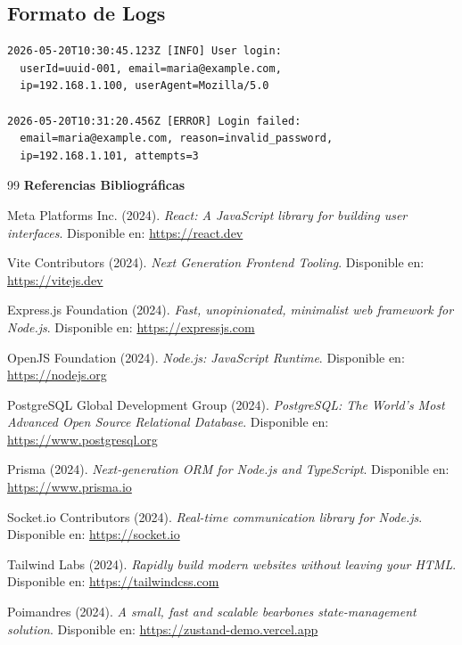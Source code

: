 \documentclass[a4paper]{report}
\begin{document}
\subsection{Formato de Logs}

\begin{lstlisting}[language=text]
2026-05-20T10:30:45.123Z [INFO] User login: 
  userId=uuid-001, email=maria@example.com, 
  ip=192.168.1.100, userAgent=Mozilla/5.0

2026-05-20T10:31:20.456Z [ERROR] Login failed: 
  email=maria@example.com, reason=invalid_password, 
  ip=192.168.1.101, attempts=3
\end{lstlisting}

\begin{thebibliography}{99}
{\Large\bfseries\color{darkblue}Referencias Bibliográficas}

\bigskip


Meta Platforms Inc. (2024). \textit{React: A JavaScript library for building user interfaces}. 
Disponible en: \url{https://react.dev}

Vite Contributors (2024). \textit{Next Generation Frontend Tooling}. 
Disponible en: \url{https://vitejs.dev}

Express.js Foundation (2024). \textit{Fast, unopinionated, minimalist web framework for Node.js}. 
Disponible en: \url{https://expressjs.com}

OpenJS Foundation (2024). \textit{Node.js: JavaScript Runtime}. 
Disponible en: \url{https://nodejs.org}

PostgreSQL Global Development Group (2024). \textit{PostgreSQL: The World's Most Advanced Open Source Relational Database}. 
Disponible en: \url{https://www.postgresql.org}

Prisma (2024). \textit{Next-generation ORM for Node.js and TypeScript}. 
Disponible en: \url{https://www.prisma.io}

Socket.io Contributors (2024). \textit{Real-time communication library for Node.js}. 
Disponible en: \url{https://socket.io}

Tailwind Labs (2024). \textit{Rapidly build modern websites without leaving your HTML}. 
Disponible en: \url{https://tailwindcss.com}

Poimandres (2024). \textit{A small, fast and scalable bearbones state-management solution}. 
Disponible en: \url{https://zustand-demo.vercel.app}


\end{thebibliography}
\end{document}
